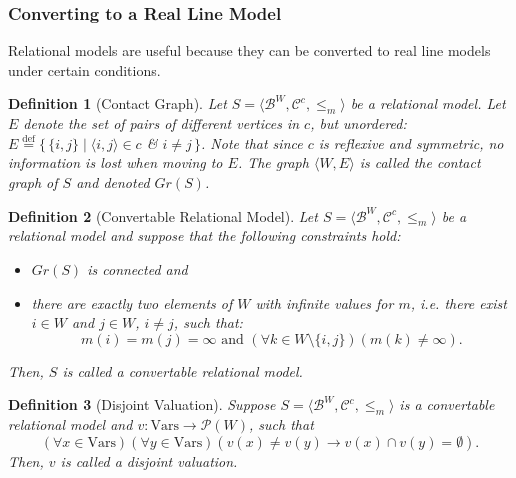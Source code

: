 \documentclass{article}
\newtheorem*{definition}{Definition}
\newcommand{\pwrset}{\mathcal{P}}
\newcommand{\B}{\mathcal{B}}
\newcommand{\Vars}{\text{Vars}}
\newcommand{\eqdef}{\stackrel{\text{def}}{=}}
\begin{document}
\subsubsection{Converting to a Real Line Model}
Relational models are useful because they can be converted to real line models under certain conditions.
\begin{definition}[Contact Graph]
  Let $S = \langle \B^W, \mathcal{C}^c, \leq_m \rangle$ be a relational model. Let $E$ denote the set of pairs of different vertices in $c$, but unordered: $E \eqdef \{\, \{i, j\} \mid \langle i, j \rangle \in c$ \& $i \neq j \,\}$. Note that since $c$ is reflexive and symmetric, no information is lost when moving to $E$.
  The graph $\langle W, E \rangle$ is called the \emph{contact graph} of $S$ and denoted $Gr(S)$.
\end{definition}
\begin{definition}[Convertable Relational Model]
Let $S = \langle \B^W, \mathcal{C}^c, \leq_m \rangle$ be a relational model and suppose that the following constraints hold:
\begin{itemize}
\item $Gr(S)$ is connected and
\item there are exactly two elements of $W$ with infinite values for $m$, i.e. there exist $i \in W$ and $j \in W$, $i \neq j$, such that:
  \begin{equation*}
    m(i) = m(j) = \infty \text{ and } (\forall k \in W \setminus \{i, j\})(m(k) \neq \infty).
  \end{equation*}
\end{itemize}
Then, $S$ is called a \emph{convertable relational model}.
\end{definition}

\begin{definition}[Disjoint Valuation]
  Suppose $S = \langle \B^W, \mathcal{C}^c, \leq_m \rangle$ is a convertable relational model and $v: \Vars \rightarrow \pwrset(W)$, such that
\begin{equation*}
(\forall x \in \Vars)(\forall y \in \Vars)(v(x) \neq v(y) \rightarrow v(x) \cap v(y) = \emptyset).
\end{equation*}
Then, $v$ is called a \emph{disjoint valuation}.
\end{definition}
\end{document}
